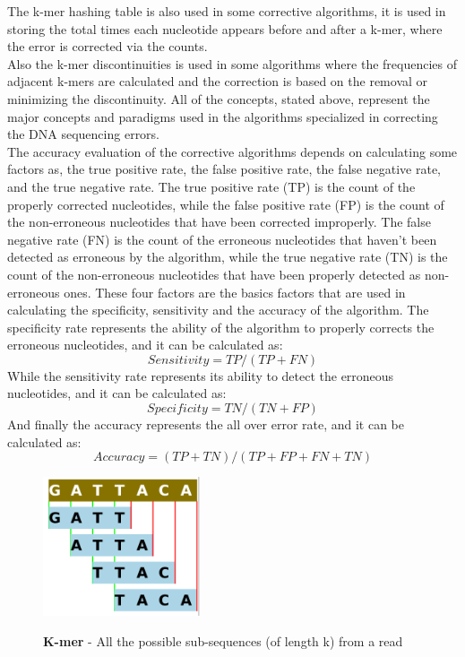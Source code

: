 \documentclass{llncs}
\begin{document}
The k-mer hashing table is also used in some corrective algorithms, it is used in storing the total times each nucleotide appears before and after a k-mer, where the error is corrected via the counts. 
\\
Also the k-mer discontinuities is used in some algorithms where the frequencies of adjacent k-mers are calculated and the correction is based on the removal or minimizing the discontinuity.
All of the concepts, stated above, represent the major concepts and paradigms used in the algorithms specialized in correcting the DNA sequencing errors.
\\
The accuracy evaluation of the corrective algorithms depends on calculating some factors as, the true positive rate, the false positive rate, the false negative rate, and the true negative rate. The true positive rate (TP) is the count of the properly corrected nucleotides, while the false positive rate (FP) is the count of the non-erroneous nucleotides that have been corrected improperly. The false negative rate (FN) is the count of the erroneous nucleotides that haven't been detected as erroneous by the algorithm, while the true negative rate (TN) is the count of the non-erroneous nucleotides that have been properly detected as non-erroneous ones. These four factors are the basics factors that are used in calculating the specificity, sensitivity and the accuracy of the algorithm. The specificity rate represents the ability of the algorithm to properly corrects the erroneous nucleotides, and it can be calculated as: 
\[ Sensitivity = TP/(TP+FN) \] 
While the sensitivity rate represents its ability to detect the erroneous nucleotides, and it can be calculated as: 
\[ Specificity = TN/(TN+FP) \] 
And finally the accuracy represents the all over error rate, and it can be calculated as: 
\[ Accuracy = (TP+TN)/(TP+FP+FN+TN) \] 


\begin{figure}
	\centering
	\includegraphics{./figs/CrrConcepts-1}
	\label{fig:fig10}
	\caption[caption]{\textbf{K-mer} - All the possible sub-sequences (of length k) from a read}
\end{figure}
%
\end{document}
